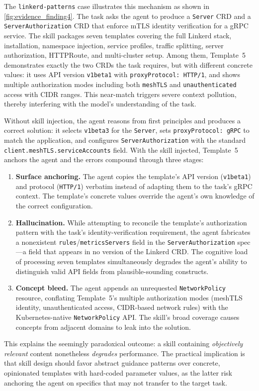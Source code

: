 \documentclass{article}
\begin{document}
The \texttt{linkerd-patterns} case illustrates this mechanism as shown in \autoref{fig:evidence_finding4}.
The task asks the agent to produce a \texttt{Server} CRD and a \texttt{ServerAuthorization} CRD that enforce mTLS identity verification for a gRPC service.
The skill packages seven templates covering the full Linkerd stack, installation, namespace injection, service profiles, traffic splitting, server authorization, HTTPRoute, and multi-cluster setup.
Among them, Template~5 demonstrates exactly the two CRDs the task requires, but with different concrete values: it uses API version \texttt{v1beta1} with \texttt{proxyProtocol: HTTP/1}, and shows multiple authorization modes including both \texttt{meshTLS} and \texttt{unauthenticated} access with CIDR ranges.
This near-match triggers severe context pollution, thereby interfering with the model's understanding of the task.

Without skill injection, the agent reasons from first principles and produces a correct solution: it selects \texttt{v1beta3} for the \texttt{Server}, sets \texttt{proxyProtocol: gRPC} to match the application, and configures \texttt{ServerAuthorization} with the standard \texttt{client.meshTLS.serviceAccounts} field.
With the skill injected, Template~5 anchors the agent and the errors compound through three stages:
\begin{enumerate}[leftmargin=*]
    \item \textbf{Surface anchoring.} The agent copies the template's API version (\texttt{v1beta1}) and protocol (\texttt{HTTP/1}) verbatim instead of adapting them to the task's gRPC context. The template's concrete values override the agent's own knowledge of the correct configuration.
    \item \textbf{Hallucination.} While attempting to reconcile the template's authorization pattern with the task's identity-verification requirement, the agent fabricates a nonexistent \texttt{rules}/\texttt{metricsServers} field in the \texttt{ServerAuthorization} spec---a field that appears in no version of the Linkerd CRD. The cognitive load of processing seven templates simultaneously degrades the agent's ability to distinguish valid API fields from plausible-sounding constructs.
    \item \textbf{Concept bleed.} The agent appends an unrequested \texttt{NetworkPolicy} resource, conflating Template~5's multiple authorization modes (meshTLS identity, unauthenticated access, CIDR-based network rules) with the Kubernetes-native \texttt{NetworkPolicy} API. The skill's broad coverage causes concepts from adjacent domains to leak into the solution.
\end{enumerate}
This explains the seemingly paradoxical outcome: a skill containing \emph{objectively relevant} content nonetheless \emph{degrades} performance.
The practical implication is that skill design should favor abstract guidance patterns over concrete, opinionated templates with hard-coded parameter values, as the latter risk anchoring the agent on specifics that may not transfer to the target task.
\end{document}

